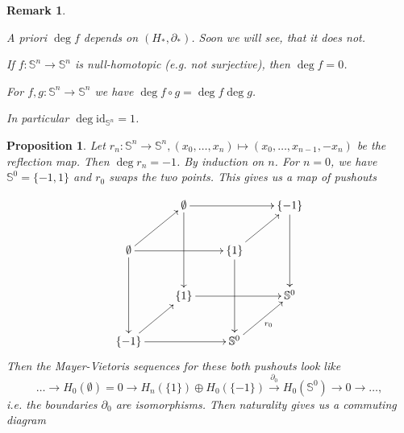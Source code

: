 \documentclass[11pt]{book}
\numberwithin{dummy}{section}
\newtheorem{proposition}[theorem]{Proposition}
\newtheorem{remark}[theorem]{Remark}
\theoremstyle{nonumberbreak}
\newenvironment{pr}[1][]{\ifthenelse{\equal{#1}{}}{\proof}{\proof[#1]}\rm}{\endproof}
\newcommand{\Sph}{\mathbb{S}}
\newcommand{\la}{\longrightarrow}
\newcommand{\id}{\mathrm{id}}
\begin{document}
\begin{spacing}{1.4}
\begin{remark}
\begin{compactenum}
\item A priori $\deg f$ depends on $(H_*, \partial_*)$. Soon we will see, that it does not.
\item If $f: \Sph^n \la \Sph^n$ is null-homotopic (e.g. not surjective), then $\deg f =0$.
\item For $f,g: \Sph^n \la \Sph^n$ we have $\deg f \circ g = \deg f \deg g$.
\item In particular $\deg \id_{\Sph^n} = 1$.

\end{compactenum}
\end{remark}



\begin{proposition}
Let $r_n: \Sph^n \la \Sph^n, (x_0, \ldots, x_{n}) \mapsto (x_0, \ldots, x_{n-1}, -x_n)$ be the reflection map. Then $\deg r_n=-1$.
\begin{pr}
By induction on $n$. For $n=0$, we have $\Sph^0 = \{-1,1\}$ and $r_0$ swaps the two points. This gives us a map of pushouts

$$
\begin{xy}
\xymatrix{
 & \emptyset \ar[rr] \ar[dd] && \{-1\} \ar[dd] \\
 \emptyset \ar[rr] \ar[dd] \ar[ru] && \{1\} \ar[dd] \ar[ru] \\
 & \{1\} \ar[rr] && \Sph^0 \\
 \{-1\} \ar[rr] \ar[ru] && \Sph^0 \ar[ru]_{r_0}
}
\end{xy}
$$
Then the Mayer-Vietoris sequences for these both pushouts look like
$$\ldots \la H_0(\emptyset) =0 \la H_n(\{1\}) \oplus H_0(\{-1\}) \xrightarrow{\partial_0} H_0(\mathbb{S}^0) \la 0 \la \ldots,$$
i.e. the boundaries $\partial_0$ are isomorphisms. Then naturality gives us a commuting diagram


\end{pr}
\end{proposition}
\end{spacing}
\end{document}
